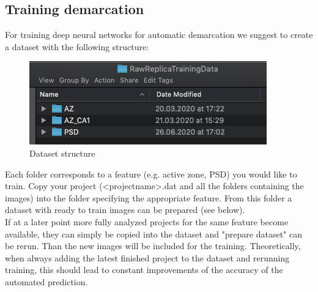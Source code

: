 \documentclass[12pt, a4paper]{scrartcl}
\begin{document}
\subsection{Training demarcation}
\label{m:trainDem}
For training deep neural networks for automatic demarcation we suggest to create a dataset with the following structure:
\begin{figure}[H]
\includegraphics[scale=0.55]{screenshots/scr_dataset.png}
\captionsetup{singlelinecheck=off}
\caption[thing]{Dataset structure}
\end{figure}
Each folder corresponds to a feature (e.g. active zone, PSD) you would like to train. Copy your project (<projectname>.dat and all the folders containing the images) into the folder specifying the appropriate feature. From this folder a dataset with ready to train images can be prepared (see below). \\
If at a later point more fully analyzed projects for the same feature become available, they can simply be copied into the dataset and "prepare dataset" can be rerun. Than the new images will be included for the training. Theoretically, when always adding the latest finished project to the dataset and rerunning training, this should lead to constant improvements of the accuracy of the automated prediction.
\end{document}
